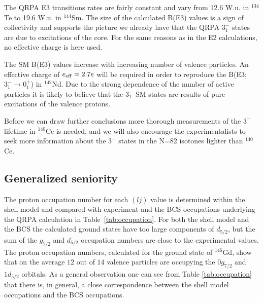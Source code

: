 The QRPA E3 transitions rates are fairly constant and vary from 12.6 W.u.
in $^{134}$Te to 19.6 W.u. in $^{144}$Sm. The size of the calculated B(E3) 
values  is a sign of collectivity 
and supports the picture we already have that the QRPA $3^{-}_{1}$ states 
are due to excitations of the core. For the same reasons as in the
E2 calculations, no effective charge is here used.

The SM B(E3) values increase with increasing number of valence particles.
An effective charge of $e_{\rm eff} = 2.7e$ will be required in order to 
reproduce the B(E3;$3^{-}_{1} \rightarrow 0^{+}_{1}$) in $^{142}$Nd. 
Due to the strong dependence of the number of active particles it is 
likely to believe that the $3^{-}_{1}$ SM states are results of pure 
excitations of the valence protons.

Before we can draw further conclusions more thorough measurements of 
the $3^{-}$ lifetime in $^{140}$Ce is needed, and we will also encourage the 
experimentalists to seek more information about the $3^{-}$ states in
the N=82 isotones lighter than $^{140}$Ce.


\subsection{Generalized seniority}

The  proton occupation number 
for each $(lj)$  value is determined within the shell model and compared with 
experiment and the BCS occupations underlying the QRPA calculation in Table\ 
\ref{tab:occupation}. For both the shell model and the BCS the calculated 
ground states have too large components of $d_{5/2}$, but the sum of the 
$g_{7/2}$ and $d_{5/2}$ occupation numbers are close to the experimental 
values. The proton occupation numbers, calculated for the ground
state of $^{146}$Gd, show that on the average $12$ out of $14$ valence 
particles are occupying the $0g_{7/2}$ and $1d_{5/2}$ orbitals. As a general
observation one can see from Table \ref{tab:occupation} that there is, in 
general, a close correspondence between the shell model occupations and the
BCS occupations.

